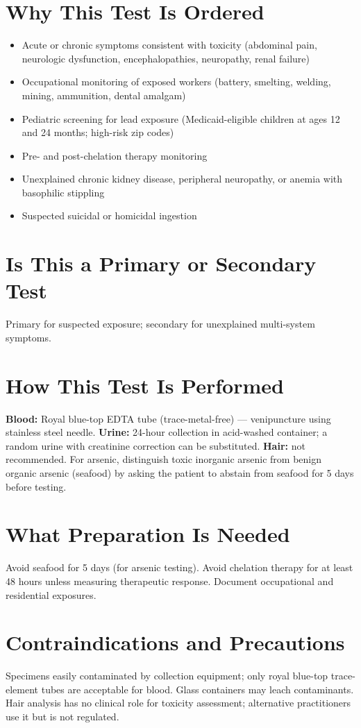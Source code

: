 \section*{Why This Test Is Ordered}
\begin{itemize}
  \item Acute or chronic symptoms consistent with toxicity (abdominal pain, neurologic dysfunction, encephalopathies, neuropathy, renal failure)
  \item Occupational monitoring of exposed workers (battery, smelting, welding, mining, ammunition, dental amalgam)
  \item Pediatric screening for lead exposure (Medicaid-eligible children at ages 12 and 24 months; high-risk zip codes)
  \item Pre- and post-chelation therapy monitoring
  \item Unexplained chronic kidney disease, peripheral neuropathy, or anemia with basophilic stippling
  \item Suspected suicidal or homicidal ingestion
\end{itemize}

\section*{Is This a Primary or Secondary Test}
Primary for suspected exposure; secondary for unexplained multi-system symptoms.

\section*{How This Test Is Performed}
\textbf{Blood:} Royal blue-top EDTA tube (trace-metal-free) --- venipuncture using stainless steel needle. \textbf{Urine:} 24-hour collection in acid-washed container; a random urine with creatinine correction can be substituted. \textbf{Hair:} not recommended. For arsenic, distinguish toxic inorganic arsenic from benign organic arsenic (seafood) by asking the patient to abstain from seafood for 5 days before testing.

\section*{What Preparation Is Needed}
Avoid seafood for 5 days (for arsenic testing). Avoid chelation therapy for at least 48 hours unless measuring therapeutic response. Document occupational and residential exposures.

\section*{Contraindications and Precautions}
Specimens easily contaminated by collection equipment; only royal blue-top trace-element tubes are acceptable for blood. Glass containers may leach contaminants. Hair analysis has no clinical role for toxicity assessment; alternative practitioners use it but is not regulated.

